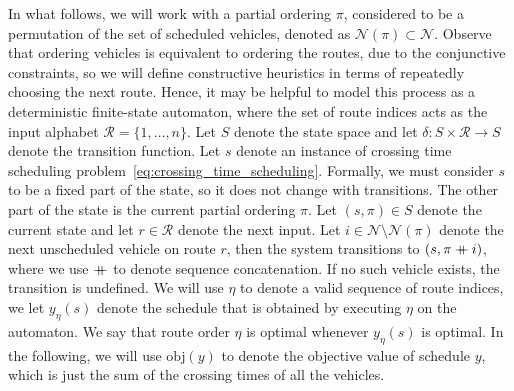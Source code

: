 \documentclass[a4paper]{article}
\newcommand\mdoubleplus{\mathbin{+\mkern-10mu+}}
\theoremstyle{definition}
\theoremstyle{plain}
\begin{document}
%
In what follows, we will work with a partial ordering $\pi$, considered to be a
permutation of the set of scheduled vehicles, denoted as
$\mathcal{N}(\pi) \subset \mathcal{N}$.
%
Observe that ordering vehicles is equivalent to ordering the routes, due to the
conjunctive constraints, so we will define constructive heuristics in terms of
repeatedly choosing the next route. Hence, it may be helpful to model this
process as a deterministic finite-state automaton, where the set of route
indices acts as the input alphabet $\mathcal{R} = \{ 1, \dots, n \}$. Let $S$ denote
the state space and let $\delta: S \times \mathcal{R} \rightarrow S$ denote the transition function.
Let $s$ denote an instance of crossing time scheduling problem~\eqref{eq:crossing_time_scheduling}. Formally, we
must consider $s$ to be a fixed part of the state, so it does not change with
transitions. The other part of the state is the current partial ordering $\pi$.
Let $(s, \pi) \in S$ denote the current state and let $r \in \mathcal{R}$ denote the
next input. Let $i \in \mathcal{N} \setminus \mathcal{N}(\pi)$ denote the next unscheduled
vehicle on route $r$, then the system transitions to $(s, \pi \mdoubleplus i)$,
where we use $\mdoubleplus$ to denote sequence concatenation. If no such vehicle
exists, the transition is undefined.
%
We will use $\eta$ to denote a valid sequence of route indices, we let $y_{\eta}(s)$
denote the schedule that is obtained by executing $\eta$ on the automaton. We say
that route order $\eta$ is optimal whenever $y_{\eta}(s)$ is optimal. In the
following, we will use $\mathrm{obj}(y)$ to denote the objective value of
schedule $y$, which is just the sum of the crossing times of all the vehicles.

%
%
\end{document}
